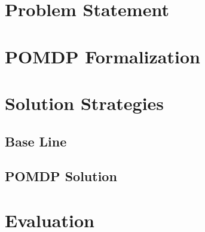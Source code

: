 \section{Problem Statement}\label{sec:hri-problem-statement}
\section{POMDP Formalization}\label{sec:hri-pomdp-formalization}
\section{Solution Strategies}\label{sec:hri-solutions}
\subsection{Base Line}\label{sec:hri-base-line}
\subsection{POMDP Solution}\label{sec:hri-planners}
\section{Evaluation}\label{sec:hri-evaluation}
